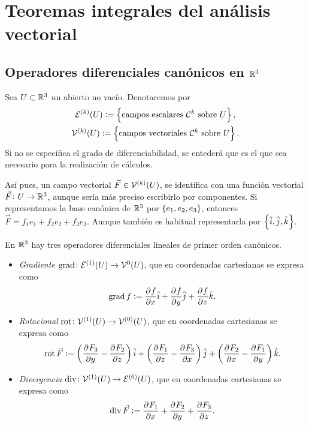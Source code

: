 \chapter{Teoremas integrales del análisis vectorial}

\section{Operadores diferenciales canónicos en $\mathbb{R}^3$}

\begin{obs}
    Sea $U \subset \mathbb{R}^3$ un abierto no vacío. Denotaremos por
    \begin{gather*}
        \mathcal{E}^{(k)} (U) := \left\{\text{campos escalares } \mathcal{C}^k \text{ sobre } U\right\}, \\ 
        \mathcal{V}^{(k)}(U) := \left\{\text{campos vectoriales } \mathcal{C}^k \text{ sobre } U\right\}.
    \end{gather*}
    Si no se especifica el grado de diferenciabilidad, se entederá que es el que sea necesario para la realización
    de cálculos.

    Así pues, un campo vectorial $\vec{F} \in \mathcal{V}^{\left( k \right)}(U)$, se identifica con una función vectorial
    $\vec{F} \colon U \to \mathbb{R}^3$, aunque sería más preciso escribirlo por componentes. Si representamos
    la base canónica de $\mathbb{R}^3$ por $\left\{e_1, e_2, e_3\right\}$, entonces $\vec{F} = f_1e_1 + f_2e_2 + f_3e_3$.
    Aunque tambi\'en es habitual representarla por $\left\{\hat{i}, \hat{j}, \hat{k}\right\}$.
\end{obs}

\begin{defi}
    En $\mathbb{R}^3$ hay tres operadores diferenciales lineales de primer orden canónicos.
    \begin{itemize}
 
        \item \emph{Gradiente} $\operatorname{grad} \colon \mathcal{E}^{(1)}(U) \to \mathcal{V}^{0}(U)$, que en coordenadas cartesianas
            se expresa como
            \[
                \operatorname{grad} f := \frac{\partial^{} f}{\partial x^{}} \hat{i} + \frac{\partial^{} f}{\partial y^{}} \hat{j} + \frac{\partial^{} f}{\partial z^{}} \hat{k}.
            \]
        \item \emph{Rotacional} $\operatorname{rot} \colon \mathcal{V}^{(1)} (U) \to \mathcal{V}^{(0)}(U)$, que en coordenadas cartesianas
            se expresa como
            \[
                \operatorname{rot} \vec{F} := \left( \frac{\partial^{} F_3}{\partial y^{}} - \frac{\partial^{} F_2}{\partial z^{}} \right)\hat{i} +
                \left( \frac{\partial^{} F_1}{\partial z^{}} - \frac{\partial^{} F_3}{\partial x^{}} \right) \hat{j} + \left( \frac{\partial^{} F_2}{\partial x^{}} - \frac{\partial^{} F_1}{\partial y^{}} \right) \hat{k}.
            \]
        \item \emph{Divergencia} $\operatorname{div} \colon \mathcal{V}^{(1)} (U) \to \mathcal{E}^{(0)} (U)$, que en coordenadas cartesianas
            se expresa como
            \[
                \operatorname{div} \vec{F} := \frac{\partial^{} F_1}{\partial x^{}} + \frac{\partial^{} F_2}{\partial y^{}} + \frac{\partial^{} F_3}{\partial z^{}}.
            \]
    \end{itemize}
\end{defi}

